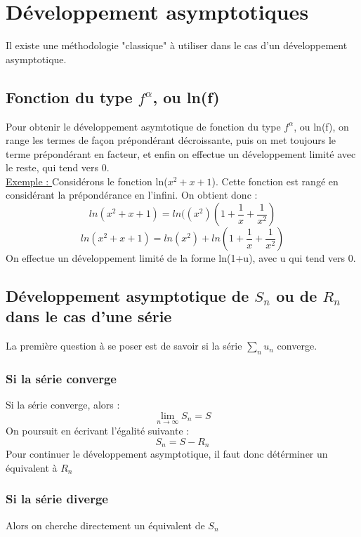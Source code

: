 \chapter{Développement asymptotiques}
Il existe une méthodologie "classique" à utiliser dans le cas d'un développement asymptotique.
\section{Fonction du type $f^{\alpha}$, ou ln(f)}
Pour obtenir le développement asymtotique de fonction du type $f^{\alpha}$, ou ln(f), on range les termes de façon prépondérant décroissante, puis on met toujours le terme prépondérant en facteur, et enfin on effectue un développement limité avec le reste, qui tend vers 0.\\
\underline{Exemple : }
Considérons le fonction ln($x^2+x+1$). Cette fonction est rangé en considérant la prépondérance en l'infini. On obtient donc : 
$$ln(x^2+x+1) = ln((x^2)(1+\dfrac{1}{x}+\dfrac{1}{x^2})$$
$$ln(x^2+x+1) = ln(x^2) + ln(1+\dfrac{1}{x}+\dfrac{1}{x^2})$$
On effectue un développement limité de la forme ln(1+u), avec u qui tend vers 0.
\section{Développement asymptotique de $S_n$ ou de $R_n$ dans le cas d'une série}
La première question à se poser est de savoir si la série $\underset{n}\sum u_n$ converge.
\subsection{Si la série converge}
Si la série converge, alors :
$$\lim_{n\rightarrow \infty} S_n = S$$
On poursuit en écrivant l'égalité suivante : 
$$S_n = S - R_n$$
Pour continuer le développement asymptotique, il faut donc détérminer un équivalent à $R_n$
\subsection{Si la série diverge}
Alors on cherche directement un équivalent de $S_n$
